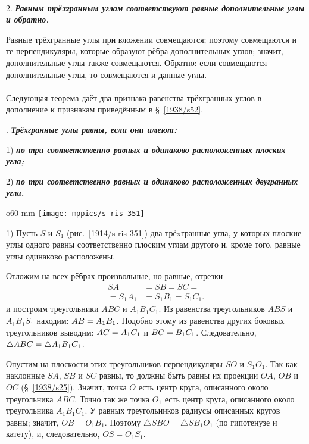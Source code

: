 {\paragraph{}\label{1914/401} 
 2. \textbf{\emph{Равным трёxгранным углам соответствуют равные дополнительные углы и обратно.}}

Равные трёхгранные углы при вложении совмещаются; поэтому совмещаются и те перпендикуляры, которые образуют рёбра дополнительных углов; значит, дополнительные углы также совмещаются.
Обратно: если совмещаются дополнительные углы, то совмещаются и данные углы.

\paragraph{}\label{1914/402}
Следующая теорема даёт два признака равенства трёхгранных углов в дополнение к признакам приведённым в §~\ref{1938/s52}.

\medskip

.
\textbf{\emph{Трёхгранные углы равны, если они имеют:}}

1) \textbf{\emph{по три соответственно равных и одинаково расположенных плоских угла;}}

2) \textbf{\emph{по три соответственно равных и одинаково расположенных двугранных угла.}} 

\begin{wrapfigure}{o}{60 mm}
\vskip-0mm
\centering
\texttt{[image: mppics/s-ris-351]}
\caption{}\label{1914/s-ris-351}
\end{wrapfigure}

1) Пусть $S$ и $S_1$ (рис.~\ref{1914/s-ris-351}) два трёxгранные угла, у которых плоские углы одного равны соответственно плоским углам другого и, кроме того, равные углы одинаково расположены.

Отложим на всех рёбрах произвольные, но равные, отрезки 
\begin{align*}SA &= SB = SC =
\\
 =S_1A_1 &=S_1B_1 = S_1C_1. 
\end{align*}
и построим треугольники $ABC$ и $A_1B_1C_1$.
Из равенства треугольников $ABS$ и $A_1B_1S_1$ находим: $AB \z= A_1B_1$.
Подобно этому из равенства других боковых треугольников выводим: $AC \z= A_1C_1$ и $BC\z=B_1C_1$.
Следовательно, $\triangle ABC\z=\triangle A_1B_1C_1$.

Опустим на плоскости этих треугольников перпендикуляры $SO$ и $S_1O_1$.
Так как наклонные $SA$, $SB$ и $SC$ равны, то должны быть равны их проекции $OA$, $OB$ и $OC$ (§~\ref{1938/s25}).
Значит, точка $O$ есть центр круга, описанного около треугольника $ABC$.
Точно так же точка $O_1$ есть центр круга, описанного около треугольника $A_1B_1C_1$.
У равных треугольников радиусы описанных кругов равны; значит, $OB = O_1B_1$.
Поэтому $\triangle SBO=\triangle SB_1O_1$ (по гипотенузе и катету), и, следовательно, $OS = O_1S_1$.

}
